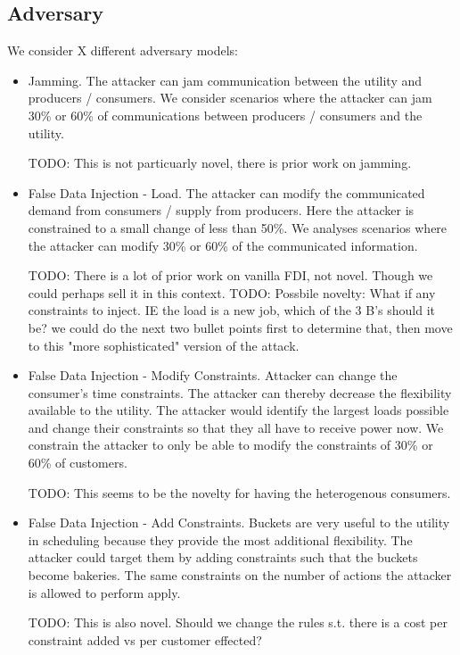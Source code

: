 \documentclass[conference]{IEEEtran}
\begin{document}
\subsection{Adversary}
\label{Adversary}

We consider X different adversary models:

\begin{itemize}
\item Jamming. The attacker can jam communication between the utility and producers / consumers.  We consider scenarios 
where the attacker can jam 30\% or 60\% of communications between producers / consumers and the utility.

TODO: This is not particuarly novel, there is prior work on jamming.  

\item False Data Injection - Load. The attacker can modify the communicated demand from consumers / supply from producers.  
Here the attacker is constrained to a small change of less than 50\%.  We analyses scenarios where the attacker can modify
30\% or 60\% of the communicated information.

TODO: There is a lot of prior work on vanilla FDI, not novel.  Though we could perhaps sell it in this context.
TODO: Possbile novelty:  What if any constraints to inject.  IE the load is a new job, which of the 3 B's should it be?
we could do the next two bullet points first to determine that, then move to this "more sophisticated" version of the 
attack.

\item False Data Injection - Modify Constraints. Attacker can change the consumer's time constraints.  The attacker can
thereby decrease the flexibility available to the utility.  The attacker would identify the largest loads possible and 
change their constraints so that they all have to receive power now.  We constrain the attacker to only be able to modify the
constraints of 30\% or 60\% of customers.

TODO:  This seems to be the novelty for having the heterogenous consumers.

\item False Data Injection - Add Constraints.  Buckets are very useful to the utility in scheduling because they provide
the most additional flexibility.  The attacker could target them by adding constraints such that the buckets become bakeries.
The same constraints on the number of actions the attacker is allowed to perform apply.

TODO: This is also novel.  Should we change the rules s.t. there is a cost per constraint added vs per customer effected?

\end{itemize}
\end{document}
